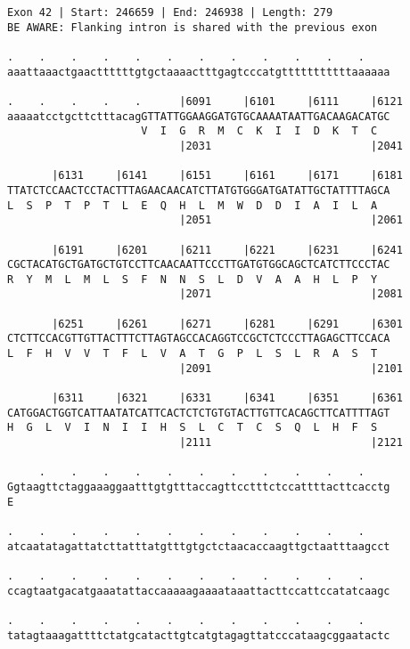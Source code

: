 \documentclass{article}
\begin{document}
\begin{Verbatim}[fontfamily=courier]
Exon 42 | Start: 246659 | End: 246938 | Length: 279
BE AWARE: Flanking intron is shared with the previous exon

.    .    .    .    .    .    .    .    .    .    .    .    
aaattaaactgaacttttttgtgctaaaactttgagtcccatgtttttttttttaaaaaa

.    .    .    .    .      |6091     |6101     |6111     |6121
aaaaatcctgcttctttacagGTTATTGGAAGGATGTGCAAAATAATTGACAAGACATGC
                     V  I  G  R  M  C  K  I  I  D  K  T  C  
                           |2031                         |2041

       |6131     |6141     |6151     |6161     |6171     |6181
TTATCTCCAACTCCTACTTTAGAACAACATCTTATGTGGGATGATATTGCTATTTTAGCA
L  S  P  T  P  T  L  E  Q  H  L  M  W  D  D  I  A  I  L  A  
                           |2051                         |2061

       |6191     |6201     |6211     |6221     |6231     |6241
CGCTACATGCTGATGCTGTCCTTCAACAATTCCCTTGATGTGGCAGCTCATCTTCCCTAC
R  Y  M  L  M  L  S  F  N  N  S  L  D  V  A  A  H  L  P  Y  
                           |2071                         |2081

       |6251     |6261     |6271     |6281     |6291     |6301
CTCTTCCACGTTGTTACTTTCTTAGTAGCCACAGGTCCGCTCTCCCTTAGAGCTTCCACA
L  F  H  V  V  T  F  L  V  A  T  G  P  L  S  L  R  A  S  T  
                           |2091                         |2101

       |6311     |6321     |6331     |6341     |6351     |6361
CATGGACTGGTCATTAATATCATTCACTCTCTGTGTACTTGTTCACAGCTTCATTTTAGT
H  G  L  V  I  N  I  I  H  S  L  C  T  C  S  Q  L  H  F  S  
                           |2111                         |2121

     .    .    .    .    .    .    .    .    .    .    .    
Ggtaagttctaggaaaggaatttgtgtttaccagttcctttctccattttacttcacctg
E                                                           

.    .    .    .    .    .    .    .    .    .    .    .    
atcaatatagattatcttatttatgtttgtgctctaacaccaagttgctaatttaagcct

.    .    .    .    .    .    .    .    .    .    .    .    
ccagtaatgacatgaaatattaccaaaaagaaaataaattacttccattccatatcaagc

.    .    .    .    .    .    .    .    .    .    .    .    
tatagtaaagattttctatgcatacttgtcatgtagagttatcccataagcggaatactc

\end{Verbatim}
\end{document}
